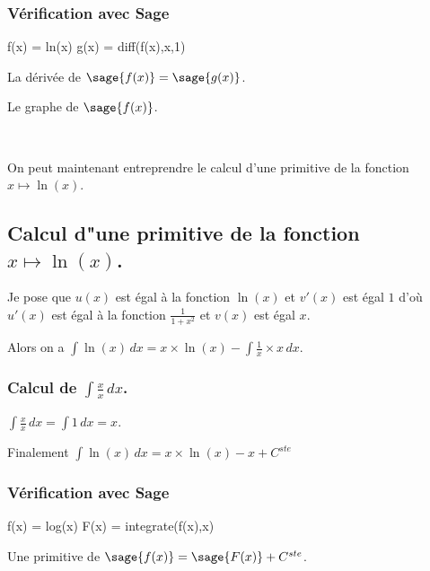 \documentclass[a4paper,landscape,17pt]{extreport} %
\begin{document}
\subsubsection{Vérification avec Sage}

\begin{sageblock}
    f(x) = ln(x)
    g(x) = diff(f(x),x,1)
\end{sageblock}

La dérivée de $\sage{f(x)} = \sage{g(x)} $.

Le graphe de $\sage{f(x)} $.


\begin{center}
 \\
\end{center}


On peut maintenant entreprendre le calcul d'une primitive de la  fonction  $x \mapsto \ln(x) $.


\subsection{Calcul d"une primitive de la fonction  $x \mapsto \ln(x) $.}


Je pose que $u(x)$  est égal à la fonction $\ln(x)$ et $v'(x)$ est égal $1$  d'où $u'(x)$  est égal à la fonction $ \frac{1}{1+ x^2} $ et $v(x)$ est égal $x$.

Alors on a $\int \ln(x) \, dx = x \times \ln(x) -\int \frac{1}{x} \times x \, dx $.


\subsubsection{Calcul de $\int \frac{x}{x} \, dx $.}

$\int \frac{x}{x} \, dx = \int 1 \, dx = x$.


Finalement $\int \ln(x) \, dx = x \times \ln(x) -x + C^{ste} $

\subsubsection{Vérification avec Sage}

\begin{sageblock}
    f(x) = log(x)
    F(x) = integrate(f(x),x)
\end{sageblock}

Une primitive de $\sage{f(x)} = \sage{F(x)} + C^{ste} $.

\end{document}
